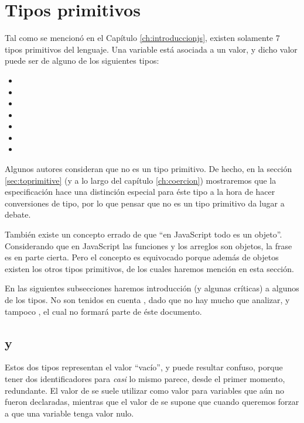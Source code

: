\section{Tipos primitivos}

Tal como se mencionó en el Capítulo \ref{ch:introduccionjs}, existen solamente 7 tipos primitivos del lenguaje. Una variable está asociada a un valor, y dicho valor puede ser de alguno de los siguientes tipos:

\begin{itemize}
\item {}
\item {}
\item {}
\item {}
\item {}
\item {}
\item {}
\end{itemize}

Algunos autores consideran que  no es un tipo primitivo. De hecho, en la sección \ref{sec:toprimitive} (y a lo largo del capítulo \ref{ch:coercion}) mostraremos que la especificación hace una distinción especial para éste tipo a la hora de hacer conversiones de tipo, por lo que pensar que  no es un tipo primitivo da lugar a debate. 

También existe un concepto errado de que "`en JavaScript todo es un objeto"'. Considerando que en JavaScript las funciones y los arreglos son objetos, la frase es en parte cierta. Pero el concepto es equivocado porque además de objetos existen los otros tipos primitivos, de los cuales haremos mención en esta sección.

En las siguientes subsecciones haremos introducción (y algunas críticas) a algunos de los tipos. No son tenidos en cuenta , dado que no hay mucho que analizar, y tampoco , el cual no formará parte de éste documento.

\subsection{ y }

Estos dos tipos representan el valor "`vacío"', y puede resultar confuso, porque tener dos identificadores para \textit{casi} lo mismo parece, desde el primer momento, redundante. El valor de  se suele utilizar como valor para variables que aún no fueron declaradas, mientras que el valor de  se supone que cuando queremos forzar a que una variable tenga valor nulo.

